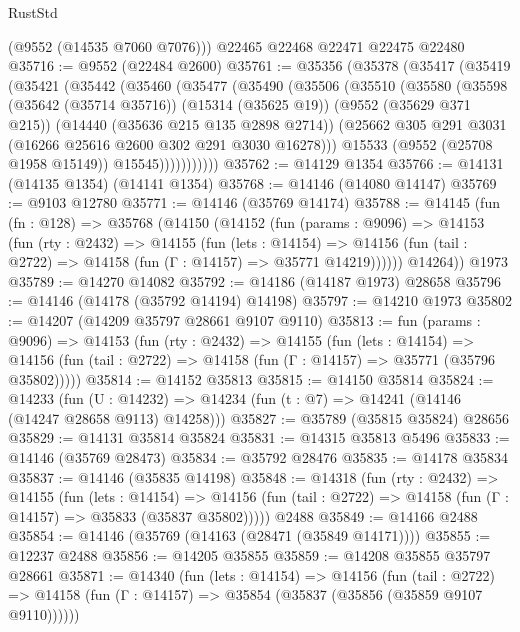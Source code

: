 \begin{lexlean}{RustStd}
\begin{coremodule}
      (@9552 (@14535 @7060 @7076)))
    @22465
    @22468
    @22471
    @22475
    @22480
@35716 := @9552 (@22484 @2600)
@35761 := @35356
    (@35378
      (@35417
        (@35419
          (@35421
            (@35442
              (@35460
                (@35477
                  (@35490
                    (@35506
                      (@35510
                        (@35580
                          (@35598
                            (@35642 (@35714 @35716))
                            (@15314 (@35625 @19))
                            (@9552 (@35629 @371 @215))
                            (@14440 (@35636 @215 @135 @2898 @2714))
                            (@25662 @305 @291 @3031 (@16266 @25616 @2600 @302 @291 @3030 @16278)))
                          @15533
                          (@9552 (@25708 @1958 @15149))
                          @15545)))))))))))
@35762 := @14129 @1354
@35766 := @14131 (@14135 @1354) (@14141 @1354)
@35768 := @14146 (@14080 @14147)
@35769 := @9103 @12780
@35771 := @14146 (@35769 @14174)
@35788 := @14145
    (fun (fn : @128) =>
    @35768
      (@14150
        (@14152
          (fun (params : @9096) =>
          @14153
            (fun (rty : @2432) =>
            @14155
              (fun (lets : @14154) =>
              @14156 (fun (tail : @2722) => @14158 (fun (Γ : @14157) => @35771 @14219))))))
        @14264))
    @1973
@35789 := @14270 @14082
@35792 := @14186 (@14187 @1973) @28658
@35796 := @14146 (@14178 (@35792 @14194) @14198)
@35797 := @14210 @1973
@35802 := @14207 (@14209 @35797 @28661 @9107 @9110)
@35813 := fun (params : @9096) =>
  @14153
    (fun (rty : @2432) =>
    @14155
      (fun (lets : @14154) =>
      @14156 (fun (tail : @2722) => @14158 (fun (Γ : @14157) => @35771 (@35796 @35802)))))
@35814 := @14152 @35813
@35815 := @14150 @35814
@35824 := @14233
    (fun (U : @14232) => @14234 (fun (t : @7) => @14241 (@14146 (@14247 @28658 @9113) @14258)))
@35827 := @35789 (@35815 @35824) @28656
@35829 := @14131 @35814 @35824
@35831 := @14315 @35813 @5496
@35833 := @14146 (@35769 @28473)
@35834 := @35792 @28476
@35835 := @14178 @35834
@35837 := @14146 (@35835 @14198)
@35848 := @14318
    (fun (rty : @2432) =>
    @14155
      (fun (lets : @14154) =>
      @14156 (fun (tail : @2722) => @14158 (fun (Γ : @14157) => @35833 (@35837 @35802)))))
    @2488
@35849 := @14166 @2488
@35854 := @14146 (@35769 (@14163 (@28471 (@35849 @14171))))
@35855 := @12237 @2488
@35856 := @14205 @35855
@35859 := @14208 @35855 @35797 @28661
@35871 := @14340
    (fun (lets : @14154) =>
    @14156
      (fun (tail : @2722) =>
      @14158 (fun (Γ : @14157) => @35854 (@35837 (@35856 (@35859 @9107 @9110))))))

\end{coremodule}
\end{lexlean}
